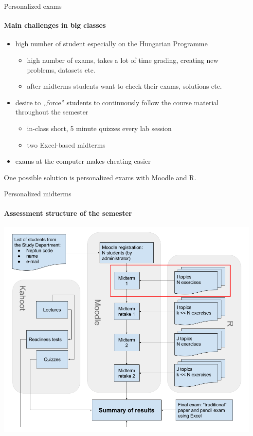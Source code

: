 \documentclass[10pt]{beamer}
\begin{document}
\begin{frame}{Personalized exams}
\framesubtitle{Main challenges in big classes}
\begin{itemize}
\item high number of student especially on the Hungarian Programme
\begin{itemize}
\item high number of exams, takes a lot of time grading, creating new problems, datasets etc.
\item after midterms students want to check their exams, solutions etc.
\end{itemize}
\item desire to ,,force'' students to continuously follow the course material throughout the semester
\begin{itemize}
\item in-class short, 5 minute quizzes every lab session
\item two Excel-based midterms
\end{itemize}
\item exams at the computer makes cheating easier
\end{itemize}
One possible solution is personalized exams with Moodle and R.
\end{frame}

\begin{frame}{Personalized midterms}
\framesubtitle{Assessment structure of the semester}
\begin{center}
\includegraphics[scale = .25]{graph/semester_workflow_eng.png}
\end{center}
\end{frame}
\end{document}
